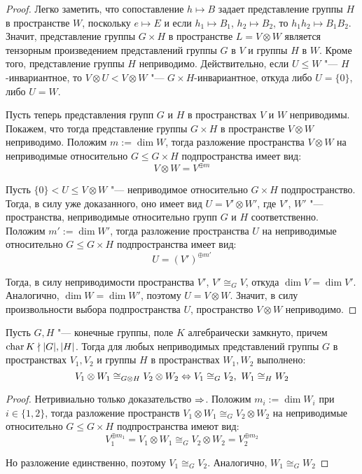 \begin{proof}
	Легко заметить, что сопоставление $h \mapsto B$ задает представление группы $H$ в пространстве $W$, поскольку $e \mapsto E$ и если $h_1 \mapsto B_1$, $h_2 \mapsto B_2$, то $h_1h_2 \mapsto B_1B_2$. Значит, представление группы $G \times H$ в пространстве $L = V \otimes W$ является тензорным произведением представлений группы $G$ в $V$ и группы $H$ в $W$. Кроме того, представление группы $H$ неприводимо. Действительно, если $U \le W$ "--- $H$-инвариантное, то $V \otimes U < V \otimes W$ "--- $G \times H$-инвариантное, откуда либо $U = \{0\}$, либо $U = W$.
	
	Пусть теперь представления групп $G$ и $H$ в пространствах $V$ и $W$ неприводимы. Покажем, что тогда представление группы $G \times H$ в пространстве $V \otimes W$ неприводимо. Положим $m := \dim{W}$, тогда разложение пространства $V \otimes W$ на неприводимые относительно $G \le G \times H$ подпространства имеет вид:
	\[V \otimes W = V^{\oplus m}\]
	
	Пусть $\{0\} < U \le V \otimes W$ "--- неприводимое относительно $G \times H$ подпространство. Тогда, в силу уже доказанного, оно имеет вид $U = V' \otimes W'$, где $V'$, $W'$ "--- пространства, неприводимые относительно групп $G$ и $H$ соответственно. Положим $m' := \dim{W'}$, тогда разложение пространства $U$ на неприводимые относительно $G \le G \times H$ подпространства имеет вид:
	\[U = (V')^{\oplus m'}\]
	
	Тогда, в силу неприводимости пространства $V'$, $V' \cong_G V$, откуда $\dim{V} = \dim{V'}$. Аналогично, $\dim{W} = \dim{W'}$, поэтому $U = V \otimes W$. Значит, в силу произвольности выбора подпространства $U$, пространство $V \otimes W$ неприводимо.
\end{proof}

\begin{theorem}
	Пусть $G, H$ "--- конечные группы, поле $K$ алгебраически замкнуто, причем $\operatorname{char}{K} \nmid |G|, |H|$. Тогда для любых неприводимых представлений группы $G$ в пространствах $V_1, V_2$ и группы $H$ в пространствах $W_1, W_2$ выполнено:
	\[V_1 \otimes W_1 \cong_{G \otimes H} V_2 \otimes W_2 \Leftrightarrow V_1 \cong_G V_2,~ W_1\cong_H W_2\]
\end{theorem}

\begin{proof}
	Нетривиально только доказательство $\Rightarrow$. Положим $m_i := \dim{W_i}$ при $i \in \{1, 2\}$, тогда разложение пространств $V_1 \otimes W_1 \cong_G V_2 \otimes W_2$ на неприводимые относительно $G \le G \times H$ подпространства имеют вид:
	\[V_1^{\oplus m_1} = V_1 \otimes W_1 \cong_G V_2 \otimes W_2 = V_2^{\oplus m_2}\]
	
	Но разложение единственно, поэтому $V_1 \cong_G V_2$. Аналогично, $W_1 \cong_G W_2$
\end{proof}